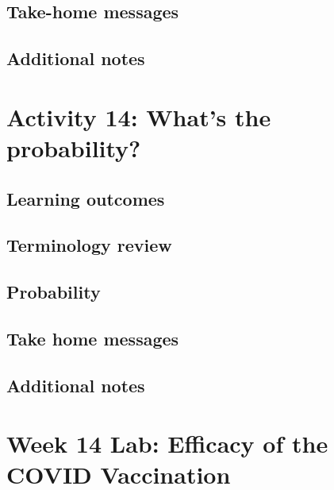 \documentclass[
]{report}
\begin{document}
\hypertarget{take-home-messages-22}{%
\subsection{Take-home messages}\label{take-home-messages-22}}

\hypertarget{additional-notes-21}{%
\subsection{Additional notes}\label{additional-notes-21}}

\hypertarget{activity-14-whats-the-probability}{%
\section{Activity 14: What's the probability?}\label{activity-14-whats-the-probability}}

\hypertarget{learning-outcomes-29}{%
\subsection{Learning outcomes}\label{learning-outcomes-29}}

\hypertarget{terminology-review-24}{%
\subsection{Terminology review}\label{terminology-review-24}}

\hypertarget{probability-1}{%
\subsection{Probability}\label{probability-1}}

\hypertarget{take-home-messages-23}{%
\subsection{Take home messages}\label{take-home-messages-23}}

\hypertarget{additional-notes-22}{%
\subsection{Additional notes}\label{additional-notes-22}}

\hypertarget{week-14-lab-efficacy-of-the-covid-vaccination}{%
\section{Week 14 Lab: Efficacy of the COVID Vaccination}\label{week-14-lab-efficacy-of-the-covid-vaccination}}
\end{document}
